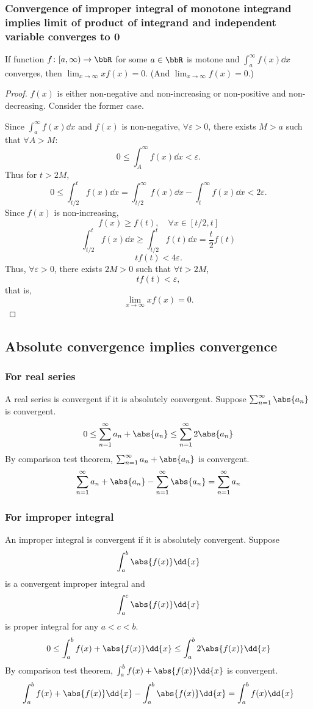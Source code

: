 \documentclass[a4paper,12pt]{report}
\begin{document}
\begin{itemize}
\begin{itemize}
\subsubsection{Convergence of improper integral of monotone integrand implies limit of product of integrand and independent variable converges to 0}
If function $f\colon[a,\infty)\to\bbR$ for some $a\in\bbR$ is motone and $\int_a^{\infty}f(x)\dd{x}$ converges, then $\lim_{x\to\infty}xf(x)=0$. (And $\lim_{x\to\infty}f(x)=0$.)
\begin{proof}
$f(x)$ is either non-negative and non-increasing or non-positive and non-decreasing. Consider the former case.

Since $\int_a^{\infty}f(x)\dd{x}$ and $f(x)$ is non-negative, $\forall\varepsilon>0$, there exists $M>a$ such that $\forall A>M$:
\[0\leq\int_A^{\infty}f(x)\dd{x}<\varepsilon.\]
Thus for $t>2M$,
\[0\leq\int_{t/2}^tf(x)\dd{x}=\int_{t/2}^{\infty}f(x)\dd{x}-\int_t^{\infty}f(x)\dd{x}<2\varepsilon.\]
Since $f(x)$ is non-increasing,
\[f(x)\geq f(t),\quad\forall x\in[t/2,t]\]
\[\int_{t/2}^tf(x)\dd{x}\geq\int_{t/2}^tf(t)\dd{x}=\frac{t}{2}f(t)\]
\[tf(t)<4\varepsilon.\]
Thus, $\forall\varepsilon>0$, there exists $2M>0$ such that $\forall t>2M$,
\[tf(t)<\varepsilon,\]
that is,
\[\lim_{x\to\infty}xf(x)=0.\]
\end{proof}
\subsection{Absolute convergence implies convergence}
\subsubsection{For real series}
A real series is convergent if it is absolutely convergent.
\bpr
Suppose $\sum_{n=1}^{\infty}\abs{a_n}$ is convergent.
\[0\leq\sum_{n=1}^{\infty}a_n+\abs{a_n}\leq\sum_{n=1}^{\infty}2\abs{a_n}\]
By comparison test theorem, $\sum_{n=1}^{\infty}a_n+\abs{a_n}$ is convergent.
\[\sum_{n=1}^{\infty}a_n+\abs{a_n}-\sum_{n=1}^{\infty}\abs{a_n}=\sum_{n=1}^{\infty}a_n\]
\epr
\subsubsection{For improper integral}
An improper integral is convergent if it is absolutely convergent.
\bpr
Suppose
\[\int_a^b\abs{f(x)}\dd{x}\]
is a convergent improper integral and
\[\int_a^c\abs{f(x)}\dd{x}\]
is proper integral for any $a<c<b$.
\[0\leq\int_a^bf(x)+\abs{f(x)}\dd{x}\leq\int_a^b2\abs{f(x)}\dd{x}\]
By comparison test theorem, $\int_a^bf(x)+\abs{f(x)}\dd{x}$ is convergent.
\[\int_a^bf(x)+\abs{f(x)}\dd{x}-\int_a^b\abs{f(x)}\dd{x}=\int_a^bf(x)\dd{x}\]
\epr

\end{itemize}
\end{itemize}
\end{document}
